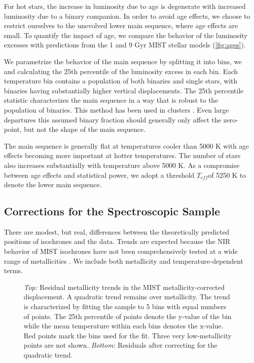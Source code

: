 \documentclass[manuscript]{aastex6}
\newcommand{\Teff}{\ensuremath{T_{eff}}}
\begin{document}
For hot stars, the increase in luminosity due to age is degenerate with
increased luminosity due to a binary companion. In order to avoid age effects,
we choose to restrict ourselves to the unevolved lower main sequence, where age
effects are small. To quantify the impact of age, we compare the
behavior of the luminosity excesses with predictions from the 1 and 9 Gyr MIST 
stellar models (\cref{fig:ages}).  

We parametrize the behavior of the main sequence by splitting it into bins, we 
and calculating the 25th percentile of the luminosity excess in each bin. Each 
temperature bin contains a population of both binaries and single stars, with 
binaries having substantially higher vertical displacements. The 25th 
percentile statistic characterizes the main sequence in a way that is robust 
to the population of binaries. This method has been used in clusters 
\citep{An06}. Even large departures this assumed binary fraction should 
generally only affect the zero-point, but not the shape of the main sequence.

The main sequence is generally flat at temperatures cooler than 5000 K with
age effects becoming more important at hotter temperatures. The number of stars
also increases substantially with temperature above 5000 K. As a compromise
between age effects and statistical power, we adopt a threshold \Teff of 
5250 K to denote the lower main sequence.

\subsection{Corrections for the Spectroscopic Sample}

There are modest, but real, differences between the theoretically predicted
positions of isochrones and the data. Trends are expected because the 
NIR behavior of MIST isochrones have not been comprehensively tested at a wide 
range of metallicities \citep{Choi16}. We include both metallicity and
temperature-dependent terms.

\begin{figure}[htb]
    \centering
    \caption{\emph{Top:} Residual metallicity trends in the MIST 
        metallicity-corrected displacement. A quadratic trend remains over 
        metallicity. The trend is characterized by fitting the sample to 
        5 bins with equal numbers of points.  The 25th percentile of points 
        denote the y-value of the bin while the mean temperature within each
        bins denotes the x-value. Red points mark the bins used for the fit. 
        Three very low-metallicity points are not shown. \emph{Bottom:} 
        Residuals after correcting for the quadratic trend.}\label{fig:met_trend}
\end{figure}
\end{document}
